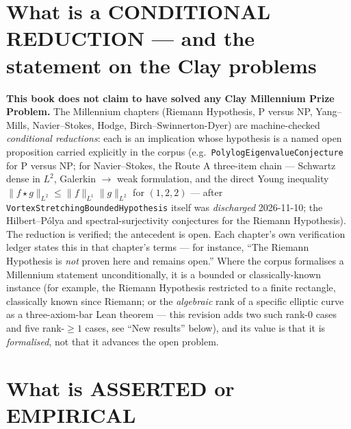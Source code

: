 \section*{What is a CONDITIONAL REDUCTION --- and the statement on the Clay problems}

\textbf{This book does not claim to have solved any Clay Millennium Prize
Problem.} The Millennium chapters (Riemann Hypothesis, P versus NP,
Yang--Mills, Navier--Stokes, Hodge, Birch--Swinnerton-Dyer) are machine-checked
\emph{conditional reductions}: each is an implication whose hypothesis is a
named open proposition carried explicitly in the corpus
(e.g.\ \texttt{PolylogEigenvalueConjecture} for P versus NP;
for Navier--Stokes, the Route A three-item chain --- Schwartz dense in
$L^2$, Galerkin $\to$ weak formulation, and the direct Young inequality
$\lVert f \star g\rVert_{L^2} \le \lVert f\rVert_{L^1}\lVert g\rVert_{L^2}$
for $(1, 2, 2)$ --- after \texttt{VortexStretchingBoundedHypothesis}
itself was \emph{discharged} 2026-11-10;
the Hilbert--P\'olya and spectral-surjectivity conjectures for the Riemann
Hypothesis). The reduction is verified; the antecedent is open. Each chapter's
own verification ledger states this in that chapter's terms --- for instance,
``The Riemann Hypothesis is \emph{not} proven here and remains open.'' Where the
corpus formalises a Millennium statement unconditionally, it is a bounded or
classically-known instance (for example, the Riemann Hypothesis restricted to a
finite rectangle, classically known since Riemann; or the \emph{algebraic}
rank of a specific elliptic curve as a three-axiom-bar Lean theorem ---
this revision adds two such rank-$0$ cases and five rank-$\ge 1$ cases, see
``New results'' below), and its value is that it is \emph{formalised}, not
that it advances the open problem.

\section*{What is ASSERTED or EMPIRICAL}


